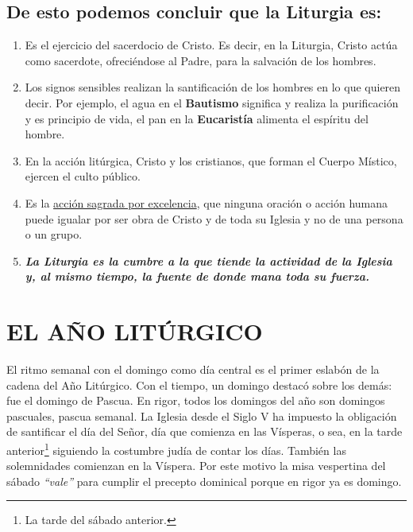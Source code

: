 \documentclass[letterpaper, 12pt]{book}
\begin{document}
    \section{De esto podemos concluir que la Liturgia es:}
    \begin{enumerate}
        \item Es el ejercicio del sacerdocio de Cristo. Es decir, en la Liturgia, Cristo act\'ua como sacerdote, ofreci\'endose al Padre, para la salvaci\'on de los hombres.
        \item Los signos sensibles realizan la santificaci\'on de los hombres en lo que quieren decir. Por ejemplo, el agua en el \textbf{Bautismo} significa y realiza la purificaci\'on y es principio de vida, el pan en la \textbf{Eucarist\'ia} alimenta el esp\'iritu del hombre.
        \item En la acci\'on lit\'urgica, Cristo y los cristianos, que forman el Cuerpo M\'istico, ejercen el culto p\'ublico.
        \item Es la \underline{acci\'on sagrada por excelencia}, que ninguna oraci\'on o acci\'on humana puede igualar por ser obra de Cristo y de toda su Iglesia y no de una persona o un grupo.
        \item \textit{\textbf{La Liturgia es la cumbre a la que tiende la actividad de la Iglesia y, al mismo tiempo, la fuente de donde mana toda su fuerza.}}
    \end{enumerate}
    
    \chapter{EL A\~NO LIT\'URGICO}
    El ritmo semanal con el domingo como d\'ia central es el primer eslab\'on de la cadena del A\~no Lit\'urgico. Con el tiempo, un domingo destac\'o sobre los dem\'as: fue el domingo de Pascua. En rigor, todos los domingos del a\~no son domingos pascuales, pascua semanal. La Iglesia desde el Siglo V ha impuesto la obligaci\'on de santificar el d\'ia del Se\~nor, d\'ia que comienza en las V\'isperas, o sea, en la tarde anterior\footnote{La tarde del s\'abado anterior.} siguiendo la costumbre jud\'ia de contar los d\'ias. Tambi\'en las solemnidades comienzan en la V\'ispera. Por este motivo la misa vespertina del s\'abado \textit{``vale''} para cumplir el precepto dominical porque en rigor ya es domingo.\newline
    
\end{document}
